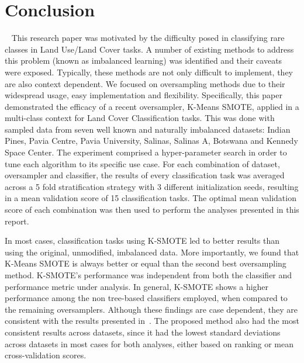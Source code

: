 \documentclass[parskip=full]{scrartcl}
\begin{document}

\section{Conclusion}~\label{sec:conclusion} 
This research paper was motivated by the difficulty posed in classifying rare classes in Land
Use/Land Cover tasks. A number of existing methods to address this problem (known as imbalanced
learning) was identified and their caveats were exposed.  Typically, these methods are not only
difficult to implement, they are also context dependent. We focused on oversampling methods due to
their widespread usage, easy implementation and flexibility.  Specifically, this paper demonstrated
the efficacy of a recent oversampler, K-Means SMOTE, applied in a multi-class context for Land Cover
Classification tasks. This was done with sampled data from seven well known and naturally imbalanced
datasets: Indian Pines, Pavia Centre, Pavia University, Salinas, Salinas A, Botswana and Kennedy
Space Center. The experiment comprised a hyper-parameter search in order to tune each algorithm to
its specific use case. For each combination of dataset, oversampler and classifier, the results of
every classification task was averaged across a 5 fold stratification strategy with 3 different
initialization seeds, resulting in a mean validation score of 15 classification tasks.  The optimal
mean validation score of each combination was then used to perform the analyses presented in this
report.

In most cases, classification tasks using K-SMOTE led to better results than using the original,
unmodified, imbalanced data. More importantly, we found that K-Means SMOTE is always better or equal
than the second best oversampling method. K-SMOTE's performance was independent from both the
classifier and performance metric under analysis. In general, K-SMOTE shows a higher performance
among the non tree-based classifiers employed, when compared to the remaining oversamplers. Although
these findings are case dependent, they are consistent with the results presented
in~\cite{Douzas2018}. The proposed method also had the most consistent results across datasets,
since it had the lowest standard deviations across datasets in most cases for both analyses, either
based on ranking or mean cross-validation scores.
\end{document}
